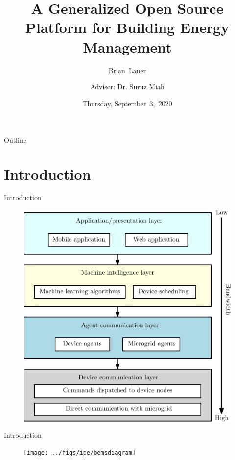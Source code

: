 \documentclass{beamer}
\title[Progress Update]{A Generalized Open Source Platform for Building Energy Management}
\author[B.~Lauer]{Brian~Lauer\\\and
Advisor: Dr. Suruz Miah}
\institute[Bradley University] %
{
  Department of Electrical and Computer Engineering\\
  Bradley University\\
  1501 W. Bradley Avenue\\
  Peoria, IL, 61625, USA
}
\date[September~3,~2020]{Thursday, September~3,~2020}
\begin{document}
\begin{frame}
  \titlepage
\end{frame}

\begin{frame}{Outline}
  \tableofcontents
\end{frame}
\section{Introduction}

\begin{frame}{Introduction}{}
  \begin{figure}
  \includegraphics[scale=0.35]{../figs/ipe/BEMS-softwareArchitecture}
  \end{figure}
\end{frame}

\begin{frame}{Introduction}{}
  \begin{figure}
  \texttt{[image: ../figs/ipe/bemsdiagram]}
  \end{figure}
\end{frame}
\end{document}
